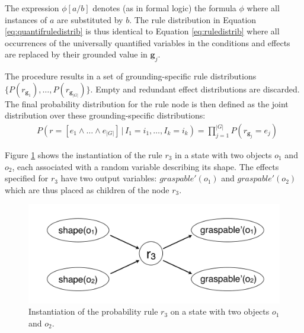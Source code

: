The expression $\phi[a/b]$ denotes (as in formal logic) the formula $\phi$ where all instances of $a$ are substituted by $b$. The rule distribution in Equation \eqref{eq:quantifruledistrib} is thus identical to Equation \eqref{eq:ruledistrib} where all occurrences of the universally quantified variables in the conditions and effects are replaced by their grounded value in $\mathbf{g}_j$.

The procedure results in a set of grounding-specific rule distributions $ \{ P(r_{\mathbf{g}_1}), \dots, P(r_{\mathbf{g}_{|G|}}) \}$. Empty and redundant effect distributions are discarded. The final probability distribution for the rule node is then defined as the joint distribution over these grounding-specific distributions: 
\begin{align}
& P(r\!=\![e_1 \land \dots \land e_{|G|}] \, | \, I_1\!=\!i_1, \dots, I_k\!=\!i_k) = \prod_{j=1}^{|G|} P(r_{\mathbf{g}_j}\!=\!e_j) \label{eq:quantifruledistrib2}
\end{align}


Figure \ref{fig:quantinstantitionprob} shows the instantiation of the rule $r_3$ in a state with two objects $o_1$ and $o_2$, each associated with a random variable describing its shape. The effects specified for $r_3$ have two output variables: $\mathit{graspable}'(o_1)$ and $\mathit{graspable}'(o_2)$ which are thus placed as children of the node $r_3$.  

\begin{figure}[ht]
\centering
\includegraphics[scale=0.25]{imgs/quantruleinstantiation.pdf}
\caption{Instantiation of the probability rule $r_3$ on a state with two objects $o_1$ and $o_2$.}
\label{fig:quantinstantitionprob}
\end{figure}

